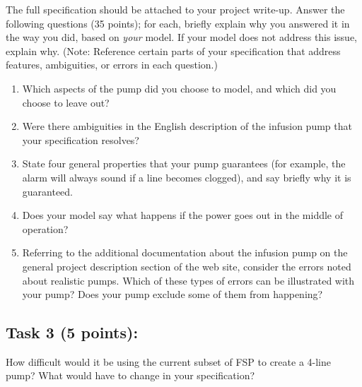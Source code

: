 \documentclass{article}
\newcommand{\head}{\subsection*}
\begin{document}
\noindent The full specification should be attached to your project
write-up. Answer the following questions (35 points); for each,
briefly explain why you answered it in the way you did, based on
\emph{your} model. If your model does not address this issue,
explain why. (Note: Reference certain parts of your specification that address features, ambiguities, or errors in each question.)

\begin{enumerate}
    \item Which aspects of the pump did you choose to model, and which did you choose to leave out?
    \item Were there ambiguities in the English description of the infusion pump that your specification resolves?
    \item State four general properties that your pump guarantees (for example, the alarm will always sound if a line becomes clogged), and say briefly why it is guaranteed.
    \item Does your model say what happens if the power goes out in the middle of operation?
    \item Referring to the additional documentation about the infusion pump on the general project description section of the web site, consider the errors noted about realistic pumps. Which of these types of errors can be illustrated with your pump? Does your pump exclude some of them from happening?

\end{enumerate}


\head{Task 3 (5 points):}


How difficult would it be using the current subset of FSP to create
a 4-line pump? What would have to change in your specification?
\end{document}
